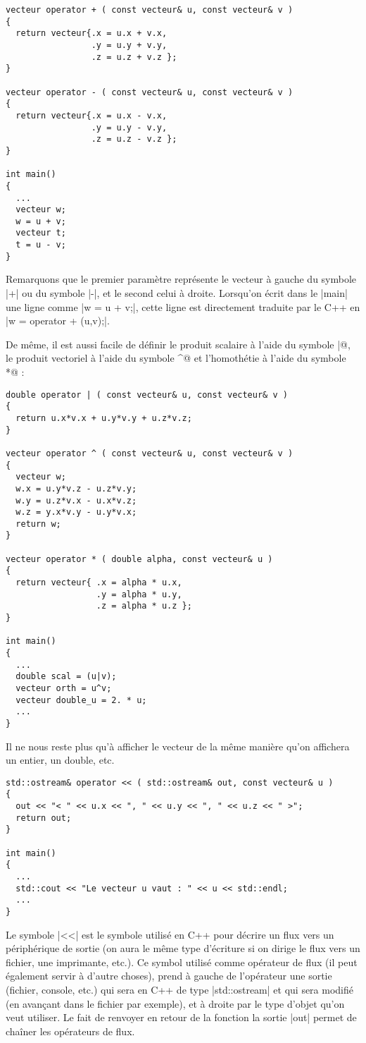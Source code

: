 \begin{itemize}
\begin{lstlisting}
vecteur operator + ( const vecteur& u, const vecteur& v )
{
  return vecteur{.x = u.x + v.x, 
                 .y = u.y + v.y, 
                 .z = u.z + v.z };
}

vecteur operator - ( const vecteur& u, const vecteur& v )
{
  return vecteur{.x = u.x - v.x, 
                 .y = u.y - v.y, 
                 .z = u.z - v.z };
}

int main()
{
  ...
  vecteur w;
  w = u + v;
  vecteur t;
  t = u - v;
}
\end{lstlisting}

Remarquons que le premier paramètre représente le vecteur à gauche du symbole |+| ou du symbole |-|, et le second celui à droite. Lorsqu'on écrit dans le |main| une ligne comme |w = u + v;|, cette ligne est directement traduite par le C++ en
|w = operator + (u,v);|.

De même, il est aussi facile de définir le produit scalaire à l'aide du symbole \verb@|@, le produit vectoriel à l'aide du symbole \verb@^@  et l'homothétie à l'aide du symbole \verb@*@ :
\begin{lstlisting}
double operator | ( const vecteur& u, const vecteur& v )
{
  return u.x*v.x + u.y*v.y + u.z*v.z;
}

vecteur operator ^ ( const vecteur& u, const vecteur& v )
{
  vecteur w;
  w.x = u.y*v.z - u.z*v.y;
  w.y = u.z*v.x - u.x*v.z;
  w.z = y.x*v.y - u.y*v.x;
  return w;
}

vecteur operator * ( double alpha, const vecteur& u )
{
  return vecteur{ .x = alpha * u.x,
                  .y = alpha * u.y,
                  .z = alpha * u.z };
}

int main()
{
  ...
  double scal = (u|v);
  vecteur orth = u^v;
  vecteur double_u = 2. * u;
  ...
}
\end{lstlisting}

Il ne nous reste plus qu'à afficher le vecteur de la même manière qu'on affichera un entier, un double, etc.

\begin{lstlisting}
std::ostream& operator << ( std::ostream& out, const vecteur& u )
{
  out << "< " << u.x << ", " << u.y << ", " << u.z << " >";
  return out;
}

int main()
{
  ...
  std::cout << "Le vecteur u vaut : " << u << std::endl;
  ...
}
\end{lstlisting}

Le symbole |<<| est le symbole utilisé en C++ pour décrire un flux vers un périphérique de sortie (on aura le même type
d'écriture si on dirige le flux vers un fichier, une imprimante, etc.). Ce symbol utilisé comme opérateur de flux (il peut
également servir à d'autre choses), prend à gauche de l'opérateur une sortie (fichier, console, etc.) qui sera en C++
de type |std::ostream| et qui sera modifié (en avançant dans le fichier par exemple), et à droite par le type d'objet qu'on
veut utiliser. Le fait de renvoyer en retour de la fonction la sortie |out| permet de chaîner les opérateurs de flux.


\end{itemize}
